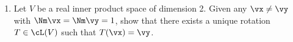 \begin{exercises}
\begin{enumerate}
	\item Let $V$ be a real inner product space of dimension 2. Given any $\vx\neq \vy$ with $\Nm\vx=\Nm\vy=1$, show that there exists a unique rotation $T\in\cL(V)$ such that $T(\vx)=\vy$.
\end{enumerate}
\end{exercises}

\fi